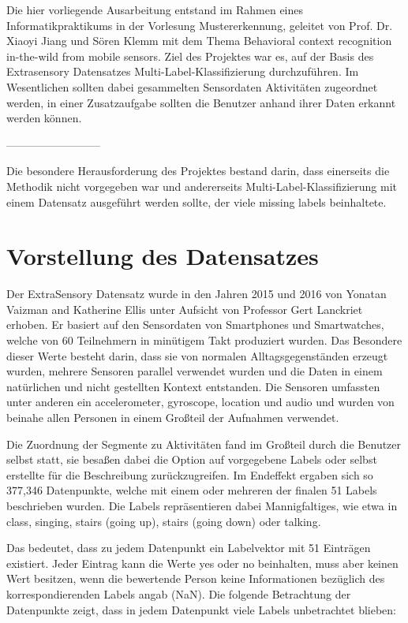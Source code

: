 \documentclass[a4paper,12pt]{scrartcl}
\begin{document}
Die hier vorliegende Ausarbeitung entstand im Rahmen eines Informatikpraktikums in der Vorlesung Mustererkennung, geleitet von Prof. Dr. Xiaoyi Jiang und Sören Klemm mit dem Thema Behavioral context recognition in-the-wild from mobile sensors. Ziel des Projektes war es, auf der Basis des Extrasensory Datensatzes Multi-Label-Klassifizierung durchzuführen. Im Wesentlichen sollten dabei gesammelten Sensordaten Aktivitäten zugeordnet werden, in einer Zusatzaufgabe sollten die Benutzer anhand ihrer Daten erkannt werden können. 

--------------------------

Die besondere Herausforderung des Projektes bestand darin, dass einerseits die Methodik nicht vorgegeben war und andererseits Multi-Label-Klassifizierung mit einem Datensatz ausgeführt werden sollte, der viele missing labels beinhaltete. 


\section{Vorstellung des Datensatzes}

Der ExtraSensory Datensatz wurde in den Jahren 2015 und 2016 von Yonatan Vaizman and Katherine Ellis unter Aufsicht von Professor Gert Lanckriet erhoben. Er basiert auf den Sensordaten von Smartphones und Smartwatches, welche von 60 Teilnehmern in minütigem Takt produziert wurden. Das Besondere dieser Werte besteht darin, dass sie von normalen Alltagsgegenständen erzeugt wurden, mehrere Sensoren parallel verwendet wurden und die Daten in einem natürlichen und nicht gestellten Kontext entstanden. Die Sensoren umfassten unter anderen ein accelerometer, gyroscope, location und audio und wurden von beinahe allen Personen in einem Großteil der Aufnahmen verwendet.

Die Zuordnung der Segmente zu Aktivitäten fand im Großteil durch die Benutzer selbst statt, sie besaßen dabei die Option auf vorgegebene Labels oder selbst erstellte für die Beschreibung zurückzugreifen. Im Endeffekt ergaben sich so 377,346 Datenpunkte, welche mit einem oder mehreren der finalen 51 Labels beschrieben wurden. Die Labels repräsentieren dabei Mannigfaltiges, wie etwa in class, singing, stairs (going up), stairs (going down) oder talking.

Das bedeutet, dass zu jedem Datenpunkt ein Labelvektor mit 51 Einträgen existiert. Jeder Eintrag kann die Werte yes oder no beinhalten, muss aber keinen Wert besitzen, wenn die bewertende Person keine Informationen bezüglich des korrespondierenden Labels angab (NaN). Die folgende Betrachtung der Datenpunkte zeigt, dass in jedem Datenpunkt viele Labels unbetrachtet blieben:
\end{document}
